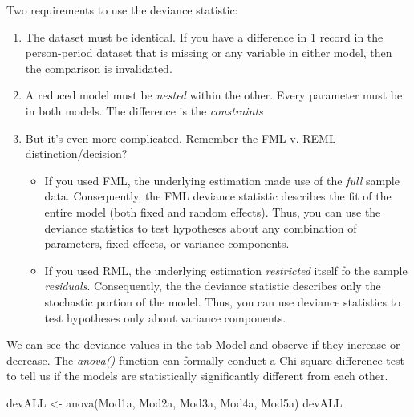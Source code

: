 \documentclass[
  11pt,
]{book}
\newenvironment{Shaded}{\begin{snugshade}}{\end{snugshade}}
\newcommand{\FunctionTok}[1]{\textcolor[rgb]{0.00,0.00,0.00}{#1}}
\newcommand{\NormalTok}[1]{#1}
\newcommand{\OtherTok}[1]{\textcolor[rgb]{0.56,0.35,0.01}{#1}}
\providecommand{\tightlist}{%
  \setlength{\itemsep}{0pt}\setlength{\parskip}{0pt}}
\begin{document}
Two requirements to use the deviance statistic:

\begin{enumerate}
\def\labelenumi{\arabic{enumi}.}
\tightlist
\item
  The dataset must be identical. If you have a difference in 1 record in the person-period dataset that is missing or any variable in either model, then the comparison is invalidated.
\item
  A reduced model must be \emph{nested} within the other. Every parameter must be in both models. The difference is the \emph{constraints}
\item
  But it's even more complicated. Remember the FML v. REML distinction/decision?

  \begin{itemize}
  \tightlist
  \item
    If you used FML, the underlying estimation made use of the \emph{full} sample data. Consequently, the FML deviance statistic describes the fit of the entire model (both fixed and random effects). Thus, you can use the deviance statistics to test hypotheses about any combination of parameters, fixed effects, or variance components.
  \item
    If you used RML, the underlying estimation \emph{restricted} itself fo the sample \emph{residuals}. Consequently, the the deviance statistic describes only the stochastic portion of the model. Thus, you can use deviance statistics to test hypotheses only about variance components.
  \end{itemize}
\end{enumerate}

We can see the deviance values in the tab-Model and observe if they increase or decrease. The \emph{anova()} function can formally conduct a Chi-square difference test to tell us if the models are statistically significantly different from each other.

\begin{Shaded}
\begin{Highlighting}[]
\NormalTok{devALL }\OtherTok{\textless{}{-}} \FunctionTok{anova}\NormalTok{(Mod1a, Mod2a, Mod3a, Mod4a, Mod5a) }
\NormalTok{devALL}
\end{Highlighting}
\end{Shaded}
\end{document}
